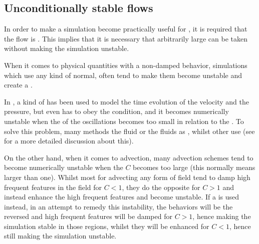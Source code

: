\subsection{Unconditionally stable flows}

In order to make a \FVM simulation become practically useful for , it is required that the flow is . This implies that it is necessary that arbitrarily large \timesteps can be taken without making the simulation unstable.

When it comes to physical quantities with a non-damped \oscillating behavior, simulations which use any kind of normal,  often tend to make them become unstable and create a .

In \thisprojectwork, a kind of  has been used to model the time evolution of the velocity and the pressure, but even  has to obey the \CFL condition, and it becomes numerically unstable when the \period of the oscillations becomes too small in relation to the \timestep. To solve this problem, many methods \approximate the fluid or the fluids as \incompressible, whilst other use  (see 
 for a more detailed discussion about this).

On the other hand, when it comes to advection, many advection schemes tend to become numerically unstable when the  $C$ becomes too large (this normally means larger than one). Whilst most  for advecting any form of field tend to damp high frequent features in the field for $C < 1$, they do the opposite for $C > 1$ and instead enhance the high frequent features and become unstable. If a  is used instead, in an attempt to remedy this instability, the behaviors will be the reversed and high frequent features will be damped for $C > 1$, hence making the simulation stable in those regions, whilst they will be enhanced for $C < 1$, hence still making the simulation unstable.

